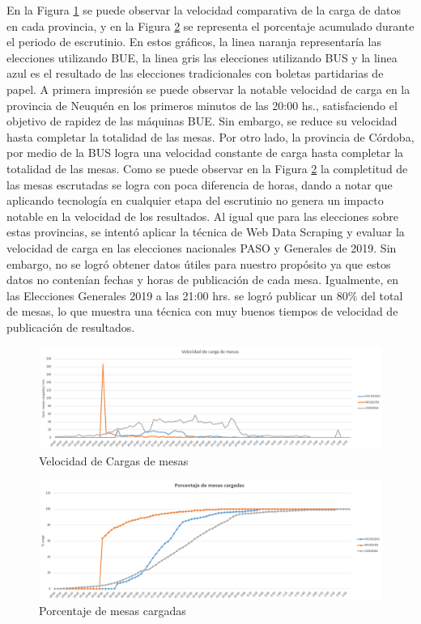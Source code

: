 En la Figura \ref{fig:velocidad} se puede observar la velocidad comparativa de la carga de datos en cada provincia, y en la Figura \ref{fig:acumulado} se representa el porcentaje acumulado durante el periodo de escrutinio. En estos gráficos, la linea naranja representaría las elecciones utilizando BUE, la linea gris las elecciones utilizando BUS y la linea azul es el resultado de las elecciones tradicionales con boletas partidarias de papel. \newline
A primera impresión se puede observar la notable velocidad de carga en la provincia de Neuquén en los primeros minutos de las 20:00 hs., satisfaciendo el objetivo de rapidez de las máquinas BUE. Sin embargo, se reduce su velocidad hasta completar la totalidad de las mesas. Por otro lado, la provincia de Córdoba, por medio de la BUS logra una velocidad constante de carga hasta completar la totalidad de las mesas. Como se puede observar en la Figura \ref{fig:acumulado} la completitud de las mesas escrutadas se logra con poca diferencia de horas, dando a notar que aplicando tecnología en cualquier etapa del escrutinio no genera un impacto notable en la velocidad de los resultados. 
Al igual que para las elecciones sobre estas provincias, se intentó aplicar la técnica de Web Data Scraping y evaluar la velocidad de carga en las elecciones nacionales PASO y Generales de 2019. Sin embargo, no se logró obtener datos útiles para nuestro propósito ya que estos datos no contenían fechas y horas de publicación de cada mesa. Igualmente, en las Elecciones Generales 2019 a las 21:00 hrs. se logró publicar un 80\% del total de mesas, lo que muestra una técnica con muy buenos tiempos de velocidad de publicación de resultados.

\newline

\begin{figure}[h!]
  \includegraphics[width=\textwidth]{img/grafico_velocidad_carga.png}
  \caption{Velocidad de Cargas de mesas}
  \label{fig:velocidad}
\end{figure}
\begin{figure}[h!]
  \includegraphics[width=\textwidth]{img/carga_mesas.png}
  \caption{Porcentaje de mesas cargadas}
  \label{fig:acumulado}
\end{figure}


